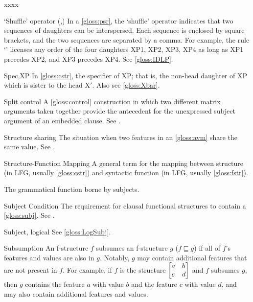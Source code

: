 \documentclass[output=paper,colorlinks,citecolor=brown]{langscibook}
\begin{document}
\begin{labeling}{xxxx}
\item[`Shuffle' operator (,)\namedlabel{gloss:Shuffle}{`Shuffle' operator}] In a \ref{gloss:psr}, the `shuffle' operator indicates that two sequences of daughters can be interspersed.  Each sequence is enclosed by square brackets, and the two sequences are separated by a comma.  For example, the rule \mbox{`'} licenses any order of the four daughters XP1, XP2, XP3, XP4 as long as XP1 precedes XP2, and XP3 precedes XP4.  See \ref{gloss:IDLP}.

\item[Spec,XP] In \ref{gloss:cstr}, the specifier of XP; that is, the non-head daughter of XP which is sister to the head X$'$.  Also see \ref{gloss:Xbar}.

\item[Split control\namedlabel{gloss:split}{split}] A \ref{gloss:control} construction in which two different matrix arguments taken together provide the antecedent for the unexpressed subject argument of an embedded clause. See .
  
\item[Structure sharing\namedlabel{gloss:StructureSharing}{Structure sharing}] The situation when two features in an \ref{gloss:avm} share the same value. See \citetv[\ref{sect:intro:sharing}]{chapters/Intro}.

\item[Structure-Function Mapping] A general term for the mapping between structure (in LFG, usually \ref{gloss:cstr}) and syntactic function (in LFG, usually \ref{gloss:fstr}).

\item[\SUBJ\namedlabel{gloss:subj}{\SUBJ}] The grammatical function borne by subjects.

\item[Subject Condition] The requirement for clausal functional structures to contain a \ref{gloss:subj}.  See \citetv[\ref{sect:gfs:subj}]{chapters/GFs}.

\item[Subject, logical] See \ref{gloss:LogSubj}.

\item[Subsumption] An f-structure $f$ subsumes an f-structure $g$ ($f \sqsubseteq g$) if all of $f$'s features and values are also in $g$.  Notably, $g$ may contain additional features that are not present in  $f$.  For example, if $f$ is the structure $\left[\begin{array}{@{}ll@{}}a & b\\c & d\end{array}\right]$ and $f$ subsumes $g$, then $g$ contains the feature $a$ with value $b$ and the feature $c$ with value $d$, and may also contain additional features and values.


\end{labeling}
\end{document}

